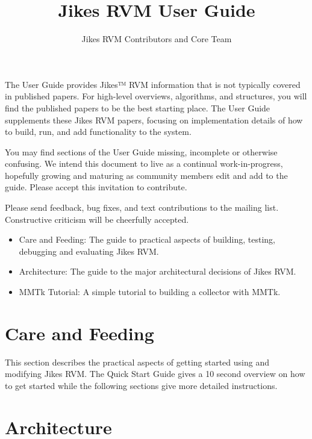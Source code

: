 \documentclass[a4paper]{book}
\title{Jikes RVM User Guide}
\author{Jikes RVM Contributors and Core Team}
\begin{document}
\maketitle

The User Guide provides Jikes™ RVM information that is not typically covered in published papers. For high-level overviews, algorithms, and structures, you will find the published papers to be the best starting place. The User Guide supplements these Jikes RVM papers, focusing on implementation details of how to build, run, and add functionality to the system.

You may find sections of the User Guide missing, incomplete or otherwise confusing. We intend this document to live as a continual work-in-progress, hopefully growing and maturing as community members edit and add to the guide. Please accept this invitation to contribute.

Please send feedback, bug fixes, and text contributions to the mailing list. Constructive criticism will be cheerfully accepted.

\begin{itemize}
  \item Care and Feeding: The guide to practical aspects of building, testing, debugging and evaluating Jikes RVM.
  \item Architecture: The guide to the major architectural decisions of Jikes RVM.
  \item MMTk Tutorial: A simple tutorial to building a collector with MMTk.
\end{itemize}

\chapter{Care and Feeding}

This section describes the practical aspects of getting started using and modifying Jikes RVM. The Quick Start Guide gives a 10 second overview on how to get started while the following sections give more detailed instructions.






\chapter{Architecture}
\end{document}
